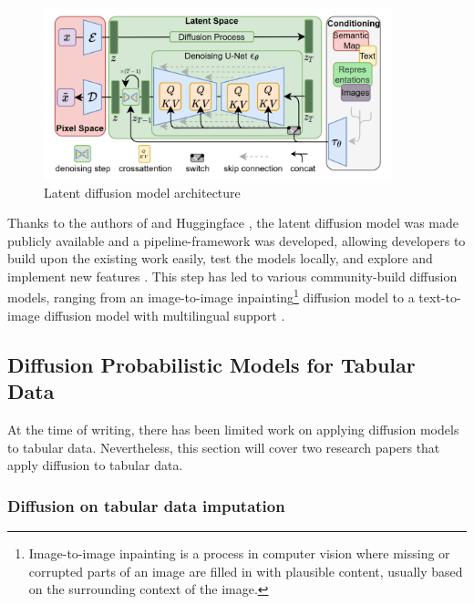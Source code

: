 \begin{figure}[h]
    \centering
    \includegraphics[width=0.9\textwidth]{images/latent-diff.png}
    \caption[Latent Diffusion Model]{Latent diffusion model architecture \cite[Figure 3, p.4]{rombach2022HighResolutionImageSynthesis}}
    \label{fig:latent-diff}
\end{figure}

Thanks to the authors of \cite{rombach2022HighResolutionImageSynthesis} and Huggingface \cite{huggingface2023HuggingFaceAI}, the latent diffusion model was made publicly available and a
pipeline-framework was developed, allowing developers to build upon the existing work easily, test the models locally, and explore and implement new features \cite{huggingface2023DiffusersPipelines}.
This step has led to various community-build diffusion models, ranging from an image-to-image inpainting\footnote{Image-to-image inpainting is a process in computer vision where missing or corrupted parts of an image are filled in with plausible content, usually based on the surrounding context of the image.} diffusion model to a text-to-image diffusion model with multilingual support \cite{huggingface2023CommunityExamples}.

\subsection{Diffusion Probabilistic Models for Tabular Data}
\label{ch:preliminaries-generativeAlgorithms-diffusionProbabilisticModelsTabularData}
At the time of writing, there has been limited work on applying diffusion models to tabular data.
Nevertheless, this section will cover two research papers that apply diffusion to tabular data.

\subsubsection{Diffusion on tabular data imputation}

